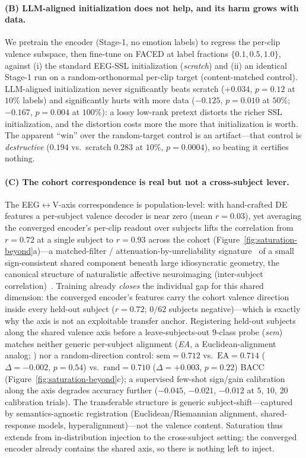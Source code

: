 \paragraph{(B) LLM-aligned initialization does not help, and its harm
grows with data.} We pretrain the encoder (Stage-1, no emotion labels) to
regress the per-clip valence subspace, then fine-tune on FACED at label
fractions $\{0.1, 0.5, 1.0\}$, against (i) the standard EEG-SSL
initialization (\emph{scratch}) and (ii) an identical Stage-1 run on a
random-orthonormal per-clip target (content-matched control).
LLM-aligned initialization never significantly beats scratch ($+0.034$,
$p{=}0.12$ at $10\%$ labels) and significantly hurts with more data
($-0.125$, $p{=}0.010$ at $50\%$; $-0.167$, $p{=}0.004$ at $100\%$): a
lossy low-rank pretext distorts the richer SSL initialization, and the
distortion costs more the more that initialization is worth. The apparent
``win'' over the random-target control is an artifact---that control is
\emph{destructive} ($0.194$ vs.\ scratch $0.283$ at $10\%$, $p{=}0.0004$),
so beating it certifies nothing.

\paragraph{(C) The cohort correspondence is real but not a cross-subject
lever.} The EEG$\leftrightarrow$V-axis correspondence is population-level:
with hand-crafted DE features a per-subject valence decoder is near zero
(mean $r{=}0.03$), yet averaging the converged encoder's per-clip readout
over subjects lifts the correlation from $r{=}0.72$ at a single subject to
$r{=}0.93$ across the cohort (Figure~\ref{fig:saturation-beyond}a)---a
matched-filter / attenuation-by-unreliability
signature~\citep{spearman1904proof} of a small sign-consistent shared
component beneath large idiosyncratic geometry, the canonical structure of
naturalistic affective neuroimaging (inter-subject
correlation)~\citep{hasson2004intersubject}. Training already
\emph{closes} the individual gap for this shared dimension: the converged
encoder's features carry the cohort valence direction inside every
held-out subject ($r{=}0.72$; $0/62$ subjects negative)---which is exactly
why the axis is not an exploitable transfer anchor. Registering held-out
subjects along the shared valence axis before a leave-subjects-out
9-class probe (\emph{sem}) matches neither generic per-subject alignment
(\emph{EA}, a Euclidean-alignment analog; \citealp{he2020transfer}) nor a
random-direction control: $\mathrm{sem}{=}0.712$ vs.\ $\mathrm{EA}{=}0.714$
($\Delta{=}{-}0.002$, $p{=}0.54$) vs.\ $\mathrm{rand}{=}0.710$
($\Delta{=}{+}0.003$, $p{=}0.22$) BACC
(Figure~\ref{fig:saturation-beyond}c); a supervised few-shot sign/gain
calibration along the axis degrades accuracy further ($-0.045$, $-0.021$,
$-0.012$ at $5$, $10$, $20$ calibration trials). The transferable
structure is generic subject-shift---captured by semantics-agnostic
registration (Euclidean/Riemannian alignment, shared-response models,
hyperalignment)---not the valence content. Saturation thus extends from
in-distribution injection to the cross-subject setting: the converged
encoder already contains the shared axis, so there is nothing left to
inject.

